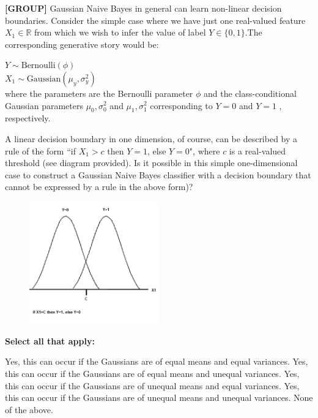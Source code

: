\documentclass[11pt,addpoints,answers]{exam}
\newcommand{\group}{\textbf{[GROUP]} }
\begin{document}
\begin{questions}
    
    
    \question[4] \group Gaussian Naive Bayes in general can learn non-linear decision boundaries. Consider the simple case where we have just one real-valued feature $X_1\in\mathbb{R}$ from which we wish to infer the value of label $Y\in\{0,1\}$.The corresponding generative story would be:
    
    $Y \sim \text{Bernoulli}(\phi)$\\
    $X_1 \sim \text{Gaussian}(\mu_y, \sigma^2_y)$\\
    where the parameters are the Bernoulli parameter $\phi$  and the class-conditional Gaussian parameters $\mu_0, \sigma^2_0$ and $\mu_1, \sigma^2_1$   corresponding to $Y=0$ and $Y=1$ , respectively.

    A linear decision boundary in one dimension, of course, can be described by a rule of the form ``if $X_1>c$  then $Y=1$, else $Y=0$", where $c$ is a real-valued threshold (see diagram provided). Is it possible in this simple one-dimensional case to construct a Gaussian Naive Bayes classifier with a decision boundary that cannot be expressed by a rule in the above form)?

    \begin{figure}[H]
        \centering
        \includegraphics[width=0.5\textwidth]{Gaussians.png}
    \end{figure}
    
    \textbf{Select all that apply:}
    {\checkboxchar{$\Box$} \checkedchar{$\blacksquare$}
    \begin{checkboxes}
        \choice Yes, this can occur if the Gaussians are of equal means and equal variances.
        \choice Yes, this can occur if the Gaussians are of equal means and unequal variances.
        \choice Yes, this can occur if the Gaussians are of unequal means and equal variances. 
        \choice Yes, this can occur if the Gaussians are of unequal means and unequal variances.
        \choice None of the above.
    \end{checkboxes}}
    

\end{questions}
\end{document}
